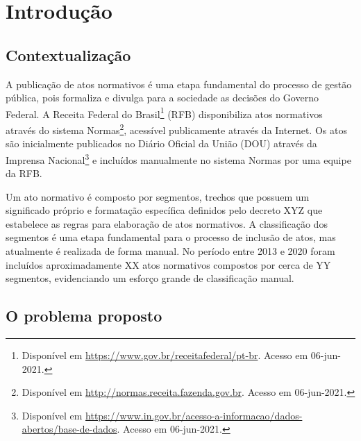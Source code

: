 \chapter{Introdução}

\section{Contextualização}

A publicação de atos normativos é uma etapa fundamental do processo de gestão pública, pois formaliza e divulga para a sociedade as decisões do Governo Federal. A Receita Federal do Brasil\footnote{Disponível em \url{https://www.gov.br/receitafederal/pt-br}. Acesso em 06-jun-2021.} (RFB) disponibiliza atos normativos através do sistema Normas\footnote{Disponível em \url{http://normas.receita.fazenda.gov.br}. Acesso em 06-jun-2021.}, acessível publicamente através da Internet. Os atos são inicialmente publicados no Diário Oficial da União (DOU) através da Imprensa Nacional\footnote{Disponível em \url{https://www.in.gov.br/acesso-a-informacao/dados-abertos/base-de-dados}. Acesso em 06-jun-2021.} e incluídos manualmente no sistema Normas por uma equipe da RFB.

Um ato normativo é composto por segmentos, trechos que possuem um significado próprio e formatação específica definidos pelo decreto XYZ que estabelece as regras para elaboração de atos normativos. A classificação dos segmentos é uma etapa fundamental para o processo de inclusão de atos, mas atualmente é realizada de forma manual. No período entre 2013 e 2020 foram incluídos aproximadamente XX atos normativos compostos por cerca de YY segmentos, evidenciando um esforço grande de classificação manual.

\section{O problema proposto}




